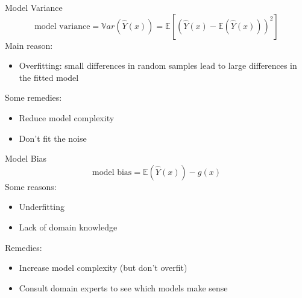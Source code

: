 \documentclass[aspectratio=169]{../latex_main/tntbeamer}  %
\begin{document}
	\begin{frame}[c]{Model Variance}
	    \begin{equation*}
	        \text{model variance} = \mathbb{V}ar(\hat{Y}(x)) = \mathbb{E}\left[(\hat{Y}(x) - \mathbb{E}(\hat{Y}(x)))^2\right]
	    \end{equation*}
	    Main reason:
	    \begin{itemize}
	        \item Overfitting: small differences in random samples lead to large differences in the fitted model
	    \end{itemize}
	    \bigskip
	    Some remedies:
	    \begin{itemize}
	        \item Reduce model complexity
	        \item Don’t fit the noise
	    \end{itemize}
	\end{frame}
	
	
	\begin{frame}[c]{Model Bias}
	    \begin{equation*}
	        \text{model bias} = \mathbb{E}(\hat{Y}(x)) - g(x)
	    \end{equation*}
	    Some reasons:
	    \begin{itemize}
	        \item Underfitting
	        \item Lack of domain knowledge
	    \end{itemize}
	    \bigskip
	    Remedies:
	    \begin{itemize}
	        \item Increase model complexity (but don’t overfit)
	        \item Consult domain experts to see which models make sense
	    \end{itemize}
	\end{frame}
	
\end{document}

